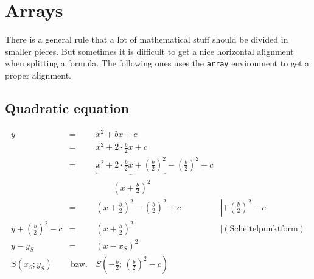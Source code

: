 \begin{table}[htb]
\section{Arrays}

There is a general rule that a lot of mathematical stuff should be
divided in smaller pieces. But sometimes it is difficult to get a nice
horizontal alignment when splitting a formula. The following ones
uses the \texttt{array} environment to get a proper alignment.


\subsection{Quadratic equation}

\begin{equation}
\begin{array}{rcll}
y & = & x^{2}+bx+c\\
  & = & x^{2}+2\cdot{\displaystyle\frac{b}{2}x+c}\\
  & = & \underbrace{x^{2}+2\cdot\frac{b}{2}x+\left(\frac{b}{2}\right)^{2}}-{\displaystyle%
 \left(\frac{b}{2}\right)^{2}+c}\\
 &  & \qquad\left(x+{\displaystyle \frac{b}{2}}\right)^{2}\\
 & = & \left(x+{\displaystyle \frac{b}{2}}\right)^{2}-\left({\displaystyle%
 \frac{b}{2}}\right)^{2}+c & \left|+\left({\displaystyle%
 \frac{b}{2}}\right)^{2}-c\right.\\
y+\left({\displaystyle \frac{b}{2}}\right)^{2}-c & = & \left(x+{\displaystyle%
 \frac{b}{2}}\right)^{2} & \left|(\textrm{Scheitelpunktform})\right.\\
y-y_{S} & = & (x-x_{S})^{2}\\
S(x_{S};y_{S}) & \,\textrm{bzw.}\, & S\left(-{\displaystyle%
 \frac{b}{2};\,\left({\displaystyle \frac{b}{2}}\right)^{2}-c}\right)
\end{array}
\end{equation}


\end{table}
